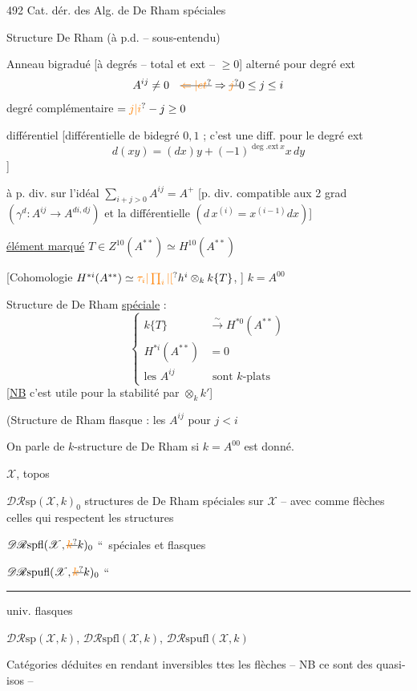 492
 Cat. dér. des Alg. de De Rham spéciales

Structure De Rham (à p.d. -- sous-entendu)

Anneau bigradué [à degrés -- total et ext -- $\geq 0$] alterné pour degré ext
\[
 A^{ij}\ne 0\quad\deleted{\unsure{\Leftarrow|et}}\Rightarrow
 \deleted{\unsure{j}}0\leq j\leq i
\]
degré complémentaire $=\unsure{j|i}-j\geq 0$

différentiel [différentielle de bidegré $0,1$ ; c'est une diff. pour le degré ext 
\[
d(xy)=(dx)y+(-1)^{\deg.\mathrm{ext}\,x}x\,dy
\]
]

à p. div. sur l'idéal $\displaystyle\sum_{i+j>0} A^{ij}=A^+$ [p. div.  compatible aux 2 grad  $(\gamma^d:A^{ij}\longrightarrow A^{di,dj})$ et la différentielle $(d\,x^{(i)}=x^{(i-1)}dx)$]

\uline{élément marqué} $T\in Z^{10}(A^{**})\simeq H^{10}(A^{**})$

[Cohomologie $H^{*i}(A^{**})\simeq\unsure{\tau_i|\prod_i|[}h^i\otimes_k k\{T\}$, ] $k=A^{00}$

Structure de De Rham \uline{spéciale} :
\[
\left\{\begin{aligned}
k\{T\}&\xrightarrow{\sim}H^{*0}(A^{**})\\
H^{*i}(A^{**})&=0\\
\text{les } A^{ij}&\text{ sont }k\text{-plats}
\end{aligned}\right.
\]
[\uline{NB} c'est utile pour la stabilité par $\otimes_k k'$]

(Structure de  Rham flasque : les $A^{ij}$ pour $j<i$ 

On parle de $k$-structure de De Rham si $k=A^{00}$ est donné.

 $\mathscr X$, topos

 $\mathscr{DR}\mathrm{sp}(\mathscr X,k)_0$ structures de De Rham spéciales sur $\mathscr X$ -- avec comme flèches celles qui respectent  les structures 

$\mathscr{DR}\mathrm{spfl}(\mathscr X,\deleted{\unsure{k}}k)_0$ \textquotedblleft\ spéciales et flasques

$\mathscr{DR}\mathrm{spufl}(\mathscr X,\deleted{\unsure{k}}k)_0$ \textquotedblleft\ \rule{1.5cm}{0.4pt} univ. flasques

$\mathscr{DR}\mathrm{sp}(\mathscr X,k)$, $\mathscr{DR}\mathrm{spfl}(\mathscr X,k)$, $\mathscr{DR}\mathrm{spufl}(\mathscr X,k)$

Catégories  déduites en rendant inversibles ttes les flèches -- NB ce sont des quasi-isos --

